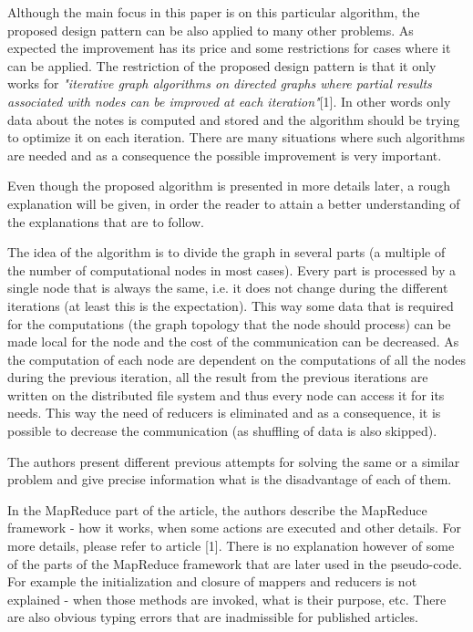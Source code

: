 \documentclass[12pt]{article}
\theoremstyle{plain}
\begin{document}
  Although the main focus in this paper is on this particular algorithm, the
  proposed design pattern can be also applied to many other problems. As
  expected the improvement has its price and some restrictions for cases where
  it can be applied. The restriction of the proposed design pattern is that it
  only works for \emph{"iterative graph algorithms on directed graphs where
    partial results associated with nodes can be improved at each
  iteration"}[1]. In other words only data about the notes is computed and
  stored and the algorithm should be trying to optimize it on each iteration. 
  There are many situations where such algorithms are needed and as a
  consequence the possible improvement is very important.  

  Even though the proposed algorithm is presented in more details later, a rough
  explanation will be given, in order the reader to attain a better
  understanding of the explanations that are to follow.

  The idea of the algorithm is to divide the graph in several parts (a multiple
  of the number of computational nodes in most cases). Every part is processed
  by a single node that is always the same, i.e. it does not change during the
  different iterations (at least this is the expectation). This way some data
  that is required for the computations (the graph topology that the node should
  process) can be made local for the node and the cost of the communication can
  be decreased. As the computation of each node are dependent on the
  computations of all the nodes during the previous iteration, all the result
  from the previous iterations are written on the distributed file system and
  thus every node can access it for its needs. This way the need of reducers is
  eliminated and as a consequence, it is possible to decrease the communication
  (as shuffling of data is also skipped).  

  The authors present different previous attempts for solving the same or a 
  similar problem and give precise information what is the disadvantage of each
  of them.

  In the MapReduce part of the article, the authors describe the MapReduce
  framework - how it works, when some actions are executed and other details.
  For more details, please refer to article [1]. There is no explanation
  however of some of the parts of the MapReduce framework that are later used
  in the pseudo-code. For example the initialization and closure of mappers and
  reducers is not explained - when those methods are invoked, what is their
  purpose, etc. There are also obvious typing errors that are inadmissible for
  published articles.  
\end{document}
